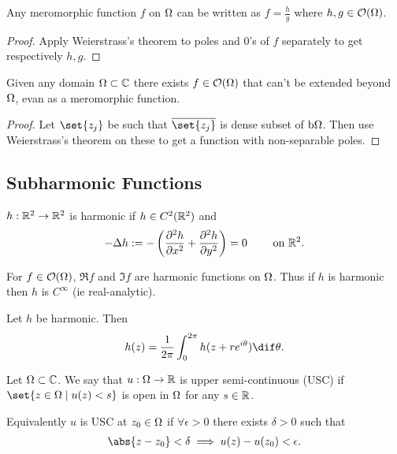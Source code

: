 \begin{corollary}
    Any meromorphic function $f$ on $\Omega$ can be written as $f = \frac{h}{g}$ where $h,g \in \mathcal{O}(\Omega)$.
\end{corollary}

\begin{proof}
    Apply Weierstrass's theorem to poles and $0$'s of $f$ separately to get respectively $h,g$.
\end{proof}

\begin{corollary}
    Given any domain $\Omega \subset \mathbb{C}$ there exists $f \in \mathcal{O} (\Omega)$ that can't be extended beyond $\Omega$, evan as a meromorphic function.
\end{corollary}

\begin{proof}
    Let $\set{z_j} $ be such that $\ov{\set{z_j}}$ is dense subset of $\operatorname{b}\! \Omega$. Then use Weierstrass's theorem on these to get a function with non-separable poles.
\end{proof}

\subsection{Subharmonic Functions}

\begin{definition}
    $h : \mathbb{R}^2 \to \mathbb{R}^2$ is harmonic if $h \in C^2 (\mathbb{R}^2)$ and 
    \begin{align*}
        -\Delta h : = -\left(  \frac{\partial^2 h }{\partial x^2} +\frac{\partial^2 h }{\partial y^2} \right) = 0 \qquad \text{ on } \mathbb{R}^2.
    \end{align*}
\end{definition}

\begin{example}
    For $f \in \mathcal{O}(\Omega)$, $\Re f$ and $\Im f$ are harmonic functions on $ \Omega$. Thus if $h$ is harmonic then $h$ is $C^\infty$ (ie real-analytic).
\end{example}

\begin{theorem}
    Let $h$ be harmonic. Then
    \begin{align*}
        h(z) = \frac{1}{2 \pi} \int_0^{2 \pi} h(z+re^{i \theta}) \dif \theta.
    \end{align*}
\end{theorem}

\begin{definition}
    Let $\Omega \subset \mathbb{C}$. We say that $u : \Omega \to \mathbb{R}$ is upper semi-continuous (USC) if $\set{z \in \om \mid u(z) < s} $ is open in $\Omega$ for any $s \in \mathbb{R}$.

    Equivalently $u$ is USC at $z_0 \in \Omega$ if $\forall \epsilon>0$ there exists $\delta > 0 $ such that
    \begin{align*}
        \abs{ z - z_0} < \delta \implies u(z) - u(z_0) < \epsilon.
    \end{align*}
\end{definition}

